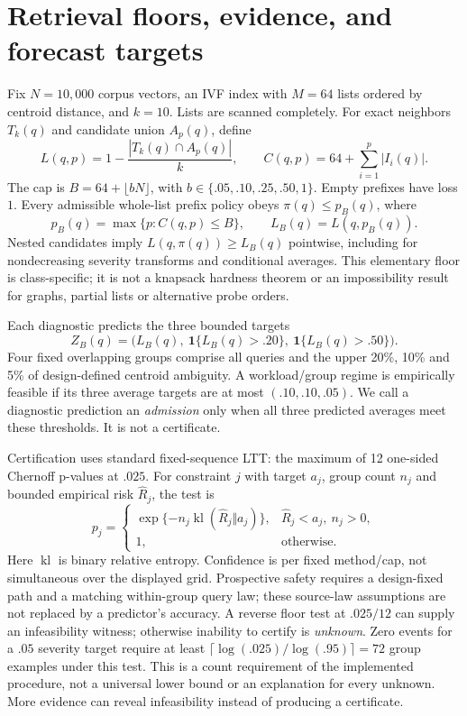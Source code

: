 \documentclass[a4paper,10pt]{esannV2}
\begin{document}
\newpage
\section{Retrieval floors, evidence, and forecast targets}
Fix $N=10{,}000$ corpus vectors, an IVF index with $M=64$ lists ordered by centroid
distance, and $k=10$. Lists are scanned completely. For exact neighbors $T_k(q)$
and candidate union $A_p(q)$, define
\begin{equation}
 L(q,p)=1-\frac{|T_k(q)\cap A_p(q)|}{k},\qquad
 C(q,p)=64+\sum_{i=1}^{p}|I_i(q)|.
\end{equation}
The cap is $B=64+\lfloor bN\rfloor$, with
$b\in\{.05,.10,.25,.50,1\}$. Empty prefixes have loss $1$. Every admissible
whole-list prefix policy obeys $\pi(q)\le p_B(q)$, where
\begin{equation}
 p_B(q)=\max\{p:C(q,p)\le B\},\qquad L_B(q)=L(q,p_B(q)).
\end{equation}
Nested candidates imply $L(q,\pi(q))\ge L_B(q)$ pointwise, including for
nondecreasing severity transforms and conditional averages. This elementary
floor is class-specific; it is not a knapsack hardness theorem or an impossibility
result for graphs, partial lists or alternative probe orders.

Each diagnostic predicts the three bounded targets
\begin{equation}
 Z_B(q)=\big(L_B(q),\ \mathbf{1}\{L_B(q)>.20\},\
 \mathbf{1}\{L_B(q)>.50\}\big).
\end{equation}
Four fixed overlapping groups comprise all queries and the upper 20\%, 10\%
and 5\% of design-defined centroid ambiguity. A workload/group regime is
empirically feasible if its three average targets are at most $(.10,.10,.05)$.
We call a diagnostic prediction an \emph{admission} only when all three predicted
averages meet these thresholds. It is not a certificate.

Certification uses standard fixed-sequence LTT: the maximum of 12 one-sided
Chernoff p-values at $.025$. For constraint $j$ with target $a_j$, group count
$n_j$ and bounded empirical risk $\widehat R_j$, the test is
\begin{equation}
p_j=\begin{cases}
\exp\{-n_j\operatorname{kl}(\widehat R_j\Vert a_j)\},&\widehat R_j<a_j,\ n_j>0,\\
1,&\text{otherwise}.
\end{cases}
\end{equation}
Here $\operatorname{kl}$ is binary relative entropy. Confidence is per fixed
method/cap, not simultaneous over the displayed grid. Prospective safety requires
a design-fixed path and a matching within-group query law; these source-law
assumptions are not replaced by a predictor's accuracy.
A reverse floor test at $.025/12$ can supply an
infeasibility witness; otherwise inability to certify is \emph{unknown}.
Zero events for a $.05$ severity target require at least
$\lceil\log(.025)/\log(.95)\rceil=72$ group examples under this test.
This is a count requirement of the implemented procedure, not a universal
lower bound or an explanation for every unknown. More evidence can reveal
infeasibility instead of producing a certificate.
\end{document}
